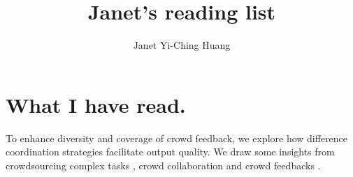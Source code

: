 \documentclass[a4paper]{article}
\title{\textbf{Janet's reading list}}
\author{Janet Yi-Ching Huang}
\begin{document}
\maketitle

\section{What I have read.}
To enhance diversity and coverage of crowd feedback, we explore how difference coordination strategies facilitate output quality. We draw some insights from crowdsourcing complex tasks \cite{Bernstein2010b, Kittur2011, Zhang2012b, Chilton2013}, crowd collaboration \cite{Kittur2010, Zhu2014, Andre2014b, Coetzee2015} and crowd feedbacks \cite{Dow2012, Xu2014, Luther2015}.


 

\end{document}
